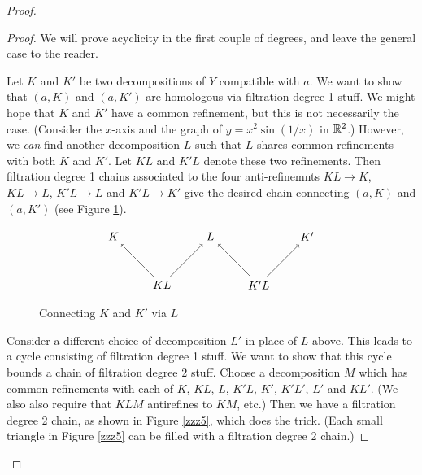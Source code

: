 \begin{proof}
\begin{proof}
We will prove acyclicity in the first couple of degrees, and 
leave the general case to the reader.

Let $K$ and $K'$ be two decompositions of $Y$ compatible with $a$.
We want to show that $(a, K)$ and $(a, K')$ are homologous via filtration degree 1 stuff.
We might hope that $K$ and $K'$ have a common refinement, but this is not necessarily
the case.
(Consider the $x$-axis and the graph of $y = x^2\sin(1/x)$ in $\mathbb{R}^2$.)
However, we {\it can} find another decomposition $L$ such that $L$ shares common
refinements with both $K$ and $K'$.
Let $KL$ and $K'L$ denote these two refinements.
Then filtration degree 1 chains associated to the four anti-refinemnts
$KL\to K$, $KL\to L$, $K'L\to L$ and $K'L\to K'$
give the desired chain connecting $(a, K)$ and $(a, K')$
(see Figure \ref{zzz4}).

\begin{figure}[!ht]
\begin{equation*}
\begin{tikzpicture}
\foreach \x/\label in {-3/K, 0/L, 3/K'} {
	\node(\label) at (\x,0) {$\label$};
}
\foreach \x/\la/\lb in {-1.5/K/L, 1.5/K'/L} {
	\node(\la \lb) at (\x,-1.5) {$\la \lb$};
	\draw[->] (\la \lb) -- (\la);
	\draw[->] (\la \lb) -- (\lb); 
}
\end{tikzpicture}
\end{equation*}
\caption{Connecting $K$ and $K'$ via $L$}
\label{zzz4}
\end{figure}

Consider a different choice of decomposition $L'$ in place of $L$ above.
This leads to a cycle consisting of filtration degree 1 stuff.
We want to show that this cycle bounds a chain of filtration degree 2 stuff.
Choose a decomposition $M$ which has common refinements with each of 
$K$, $KL$, $L$, $K'L$, $K'$, $K'L'$, $L'$ and $KL'$.
(We also also require that $KLM$ antirefines to $KM$, etc.)
Then we have a filtration degree 2 chain, as shown in Figure \ref{zzz5}, which does the trick.
(Each small triangle in Figure \ref{zzz5} can be filled with a filtration degree 2 chain.)


\end{proof}
\end{proof}
